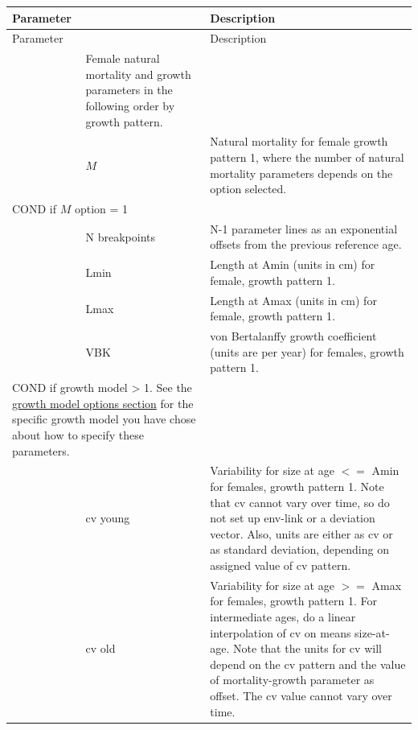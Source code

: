 \begin{longtable}{p{1cm} p{2.25cm} p{10cm}}
	\hline
	Parameter & & Description \Tstrut\Bstrut\\
	\hline
	\endfirsthead

	\hline
	Parameter & & Description \Tstrut\Bstrut\\
	\hline
	\endhead

	\hline
	\endfoot

	\endlastfoot

	\multicolumn{2}{l}{Females}\Tstrut & Female natural mortality and growth parameters in the following order by growth pattern. \\
	& $M$ & Natural mortality for female growth pattern 1, where the number of natural mortality parameters depends on the option selected. \Bstrut\\
	\hline
	\multicolumn{2}{l}{COND if $M$ option = 1} & \Tstrut\\
	& N breakpoints & N-1 parameter lines as an exponential offsets from the previous reference age. \Bstrut\\
	\hline

	& Lmin & Length at Amin (units in cm) for female, growth pattern 1. \\
	& Lmax & Length at Amax (units in cm) for female, growth pattern 1. \\
	& VBK & von Bertalanffy growth coefficient (units are per year) for females, growth pattern 1. \Bstrut\\
	\hline
	\multicolumn{2}{l}{COND if growth model > 1. See the \hyperlink{GrowthModelOptions}{growth model options section} for the specific growth model you have chose about how to specify these parameters.} & \Tstrut\\
	\hline

	\Tstrut & \gls{cv} young & Variability for size at age $<=$ Amin for females, growth pattern 1. Note that \gls{cv} cannot vary over time, so do not set up env-link or a deviation vector. Also, units are either as \gls{cv} or as standard deviation, depending on assigned value of \gls{cv} pattern. \\
	& \gls{cv} old & Variability for size at age $>=$ Amax for females, growth pattern 1. For intermediate ages, do a linear interpolation of \gls{cv} on means size-at-age. Note that the units for \gls{cv} will depend on the \gls{cv} pattern and the value of mortality-growth parameter as offset. The \gls{cv} value cannot vary over time. \Bstrut\\
	\hline


\end{longtable}
